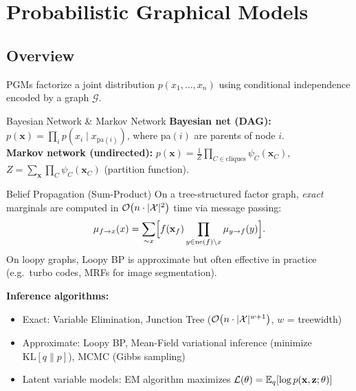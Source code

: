 \section{Probabilistic Graphical Models}

\subsection{Overview}
PGMs factorize a joint distribution $p(x_1,\ldots,x_n)$ using conditional
independence encoded by a graph $\mathcal{G}$.

\begin{defbox}{Bayesian Network \& Markov Network}
\textbf{Bayesian net (DAG):}
$p(\mathbf{x}) = \prod_{i} p(x_i \mid x_{\mathrm{pa}(i)})$, where pa$(i)$ are
parents of node $i$. \\[2pt]
\textbf{Markov network (undirected):}
$p(\mathbf{x}) = \frac{1}{Z}\prod_{C\in\mathrm{cliques}} \psi_C(\mathbf{x}_C)$,\quad
$Z = \sum_{\mathbf{x}}\prod_C \psi_C(\mathbf{x}_C)$ (partition function).
\end{defbox}

\begin{keyresult}{Belief Propagation (Sum-Product)}
On a tree-structured factor graph, \emph{exact} marginals are computed in
$\mathcal{O}\!\left(n \cdot |\mathcal{X}|^2\right)$ time via message passing:
\[
  \mu_{f\to x}(x) = \sum_{\sim x}\Bigl[f(\mathbf{x}_f)\prod_{y\in\mathrm{ne}(f)\setminus x}\mu_{y\to f}(y)\Bigr].
\]
On loopy graphs, Loopy BP is approximate but often effective in practice
(e.g.\ turbo codes, MRFs for image segmentation).
\end{keyresult}

\textbf{Inference algorithms:}
\begin{itemize}
  \item Exact: Variable Elimination, Junction Tree ($\mathcal{O}\!\left(n\cdot|\mathcal{X}|^{w+1}\right)$,
        $w$ = treewidth)
  \item Approximate: Loopy BP, Mean-Field variational inference (minimize $\mathrm{KL}[q\|p]$),
        MCMC (Gibbs sampling)
  \item Latent variable models: EM algorithm maximizes $\mathcal{L}(\theta) = \mathbb{E}_q[\log p(\mathbf{x},\mathbf{z};\theta)]$
\end{itemize}

